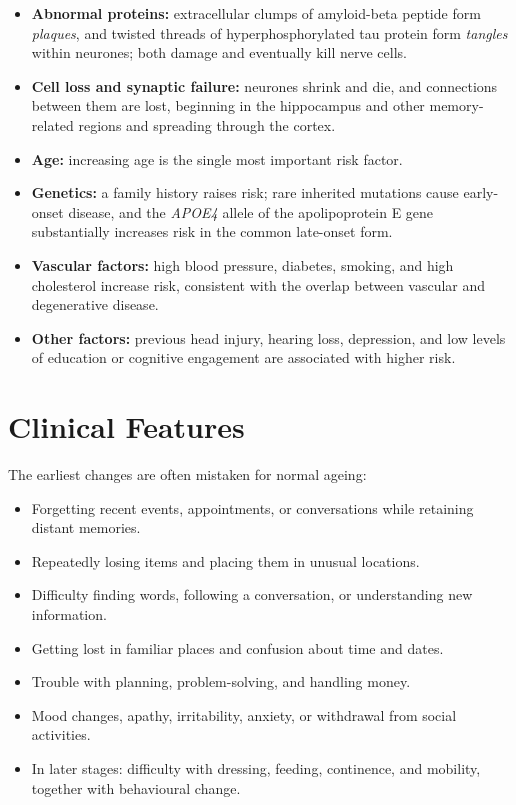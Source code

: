 \begin{itemize}
    \item \textbf{Abnormal proteins:} extracellular clumps of amyloid-beta peptide form \emph{plaques}, and twisted threads of hyperphosphorylated tau protein form \emph{tangles} within neurones; both damage and eventually kill nerve cells.
    \item \textbf{Cell loss and synaptic failure:} neurones shrink and die, and connections between them are lost, beginning in the hippocampus and other memory-related regions and spreading through the cortex.
    \item \textbf{Age:} increasing age is the single most important risk factor.
    \item \textbf{Genetics:} a family history raises risk; rare inherited mutations cause early-onset disease, and the \emph{APOE4} allele of the apolipoprotein E gene substantially increases risk in the common late-onset form.
    \item \textbf{Vascular factors:} high blood pressure, diabetes, smoking, and high cholesterol increase risk, consistent with the overlap between vascular and degenerative disease.
    \item \textbf{Other factors:} previous head injury, hearing loss, depression, and low levels of education or cognitive engagement are associated with higher risk.
\end{itemize}

\section*{Clinical Features}
The earliest changes are often mistaken for normal ageing:

\begin{itemize}
    \item Forgetting recent events, appointments, or conversations while retaining distant memories.
    \item Repeatedly losing items and placing them in unusual locations.
    \item Difficulty finding words, following a conversation, or understanding new information.
    \item Getting lost in familiar places and confusion about time and dates.
    \item Trouble with planning, problem-solving, and handling money.
    \item Mood changes, apathy, irritability, anxiety, or withdrawal from social activities.
    \item In later stages: difficulty with dressing, feeding, continence, and mobility, together with behavioural change.
\end{itemize}

